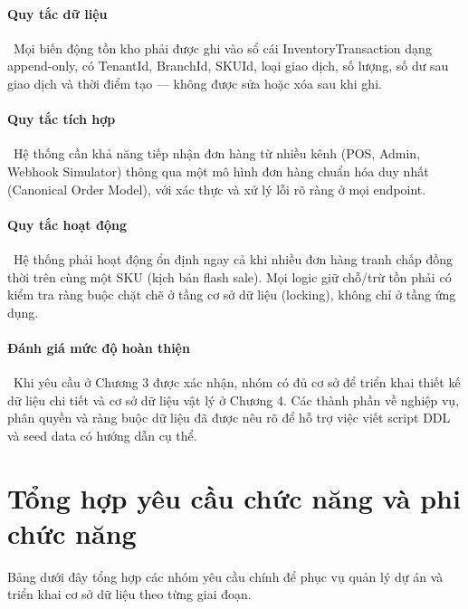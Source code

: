 \paragraph*{Quy tắc dữ liệu}\
Mọi biến động tồn kho phải được ghi vào sổ cái InventoryTransaction dạng append-only, có TenantId, BranchId, SKUId, loại giao dịch, số lượng, số dư sau giao dịch và thời điểm tạo — không được sửa hoặc xóa sau khi ghi.

\paragraph*{Quy tắc tích hợp}\
Hệ thống cần khả năng tiếp nhận đơn hàng từ nhiều kênh (POS, Admin, Webhook Simulator) thông qua một mô hình đơn hàng chuẩn hóa duy nhất (Canonical Order Model), với xác thực và xử lý lỗi rõ ràng ở mọi endpoint.

\paragraph*{Quy tắc hoạt động}\
Hệ thống phải hoạt động ổn định ngay cả khi nhiều đơn hàng tranh chấp đồng thời trên cùng một SKU (kịch bản flash sale). Mọi logic giữ chỗ/trừ tồn phải có kiểm tra ràng buộc chặt chẽ ở tầng cơ sở dữ liệu (locking), không chỉ ở tầng ứng dụng.

\paragraph*{Đánh giá mức độ hoàn thiện}\
Khi yêu cầu ở Chương 3 được xác nhận, nhóm có đủ cơ sở để triển khai thiết kế dữ liệu chi tiết và cơ sở dữ liệu vật lý ở Chương 4. Các thành phần về nghiệp vụ, phân quyền và ràng buộc dữ liệu đã được nêu rõ để hỗ trợ việc viết script DDL và seed data có hướng dẫn cụ thể.

\section{Tổng hợp yêu cầu chức năng và phi chức năng}

Bảng dưới đây tổng hợp các nhóm yêu cầu chính để phục vụ quản lý dự án và triển khai cơ sở dữ liệu theo từng giai đoạn.

